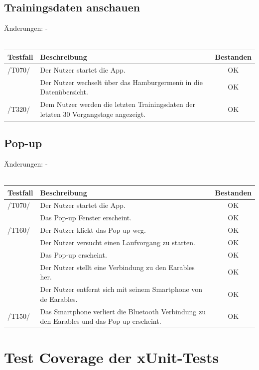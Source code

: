 \documentclass[a4paper,12pt]{article}
\newcommand{\testok}[0]{
	\cellcolor{green!25} OK
}
\begin{document}
\subsection{Trainingsdaten anschauen}
Änderungen: -
\\
\\
\begin{tabular}{ |p{1.5cm} | p{12cm} | c| }
	\hline
	\textbf{Testfall} & \textbf{Beschreibung} & \textbf{Bestanden}\\
	\hline
	/T070/ & Der Nutzer startet die App. & \testok \\
	\hline
	& Der Nutzer wechselt über das Hamburgermenü in die Datenübersicht. & \testok  \\
	\hline
	/T320/ & Dem Nutzer werden die letzten Trainingsdaten der letzten 30 Vorgangstage angezeigt. & \testok  \\
	\hline
\end{tabular}

\subsection{Pop-up}
Änderungen: -
\\
\\
\begin{tabular}{ |p{1.5cm} | p{12cm} | c| }
	\hline
	\textbf{Testfall} & \textbf{Beschreibung} & \textbf{Bestanden}\\
	\hline
	/T070/ & Der Nutzer startet die App. & \testok \\
	\hline
	& Das Pop-up Fenster erscheint. & \testok  \\
	\hline
	/T160/ & Der Nutzer klickt das Pop-up weg. & \testok  \\
	\hline
	& Der Nutzer versucht einen Laufvorgang zu starten. & \testok  \\
	\hline
	& Das Pop-up erscheint. & \testok  \\
	\hline
	& Der Nutzer stellt eine Verbindung zu den Earables her. & \testok  \\
	\hline
	& Der Nutzer entfernt sich mit seinem Smartphone von de Earables. & \testok  \\
	\hline
	/T150/ & Das Smartphone verliert die Bluetooth Verbindung zu den Earables und das Pop-up erscheint. & \testok  \\
	\hline
\end{tabular}


\section{Test Coverage der xUnit-Tests}
\end{document}
